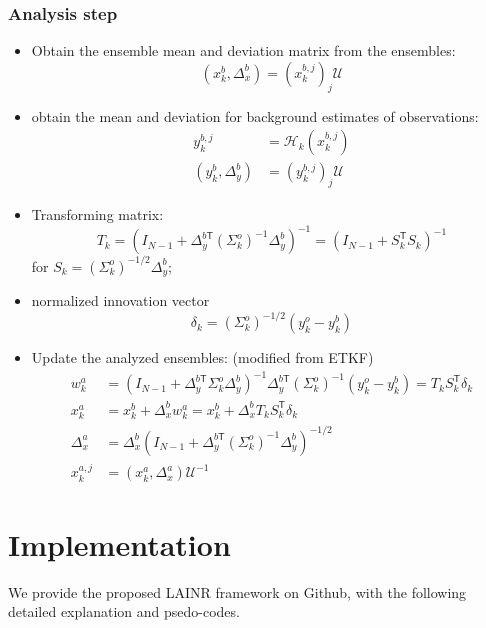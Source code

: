 \documentclass{article}
\newcommand{\trans}{\mathsf{T}}
\begin{document}
\subsubsection{Analysis step}
\begin{itemize}
	\item Obtain the ensemble mean and deviation matrix from the ensembles:
	      $$
		      (x_k^b,\Delta_x^b)=(x_k^{b,j})_j\mathscr{U}
	      $$
	\item obtain the mean and deviation for background estimates of observations:
	      \begin{align*}
		      y_k^{b,j}          & =\mathcal{H}_k(x_k^{b,j}) \\
		      (y_k^b,\Delta_y^b) & =(y_k^{b,j})_j\mathscr{U}
	      \end{align*}
	\item Transforming matrix:
	      $$
		      T_k=(I_{N-1}+\Delta_y^{b\trans}(\Sigma_k^o)^{-1}\Delta_y^b)^{-1}=(I_{N-1} + S_k^\trans S_k)^{-1}
	      $$
	      for $S_k=(\Sigma_k^o)^{-1/2}\Delta_y^b$;

	\item normalized innovation vector
	      $$
		      \delta_k = (\Sigma_k^o)^{-1/2}(y_k^o-y_k^b)
	      $$
	\item Update the analyzed ensembles: (modified from ETKF)
	      \begin{align*}
		      w_k^a      & = (I_{N-1} + \Delta_y^{b\trans}\Sigma_k^o \Delta_y^b)^{-1}\Delta_y^{b\trans}(\Sigma_k^o)^{-1}(y_k^o-y_k^b)=T_kS_k^\trans \delta_k \\
		      x_k^a      & = x_k^b + \Delta_x^bw_k^a = x_k^b + \Delta_x^bT_kS_k^\trans \delta_k                                                              \\
		      \Delta_x^a & = \Delta_x^b(I_{N-1}+\Delta_y^{b\trans}(\Sigma_k^o)^{-1}\Delta_y^b)^{-1/2}                                                        \\
		      x_k^{a,j}  & = (x_k^a,\Delta_x^a)\mathscr{U}^{-1}
	      \end{align*}
\end{itemize}
\section{Implementation}
We provide the proposed LAINR framework on Github, with the following detailed explanation and psedo-codes.
\end{document}
